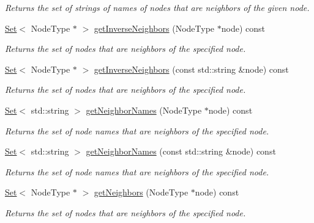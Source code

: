 \begin{DoxyCompactItemize}
\begin{DoxyCompactList}\small\item\em Returns the set of strings of names of nodes that are neighbors of the given node. \end{DoxyCompactList}\item 
\mbox{\hyperlink{classstanfordcpplib_1_1collections_1_1GenericSet}{Set}}$<$ Node\+Type $\ast$ $>$ \mbox{\hyperlink{classGraph_a80a5724c594b9bd0b6008c57b09af317}{get\+Inverse\+Neighbors}} (Node\+Type $\ast$node) const
\begin{DoxyCompactList}\small\item\em Returns the set of nodes that are neighbors of the specified node. \end{DoxyCompactList}\item 
\mbox{\hyperlink{classstanfordcpplib_1_1collections_1_1GenericSet}{Set}}$<$ Node\+Type $\ast$ $>$ \mbox{\hyperlink{classGraph_a5294846b9cdd19394808e3736ec67004}{get\+Inverse\+Neighbors}} (const std\+::string \&node) const
\begin{DoxyCompactList}\small\item\em Returns the set of nodes that are neighbors of the specified node. \end{DoxyCompactList}\item 
\mbox{\hyperlink{classstanfordcpplib_1_1collections_1_1GenericSet}{Set}}$<$ std\+::string $>$ \mbox{\hyperlink{classGraph_ae9b5cbd2bcb3918c4c64b1eb71c1a3a8}{get\+Neighbor\+Names}} (Node\+Type $\ast$node) const
\begin{DoxyCompactList}\small\item\em Returns the set of node names that are neighbors of the specified node. \end{DoxyCompactList}\item 
\mbox{\hyperlink{classstanfordcpplib_1_1collections_1_1GenericSet}{Set}}$<$ std\+::string $>$ \mbox{\hyperlink{classGraph_a6175b4d672266465dd34e070c7710b34}{get\+Neighbor\+Names}} (const std\+::string \&node) const
\begin{DoxyCompactList}\small\item\em Returns the set of node names that are neighbors of the specified node. \end{DoxyCompactList}\item 
\mbox{\hyperlink{classstanfordcpplib_1_1collections_1_1GenericSet}{Set}}$<$ Node\+Type $\ast$ $>$ \mbox{\hyperlink{classGraph_a0e49b167f0623a8ae76040c3e5eab3fb}{get\+Neighbors}} (Node\+Type $\ast$node) const
\begin{DoxyCompactList}\small\item\em Returns the set of nodes that are neighbors of the specified node. \end{DoxyCompactList}\item 

\end{DoxyCompactItemize}
